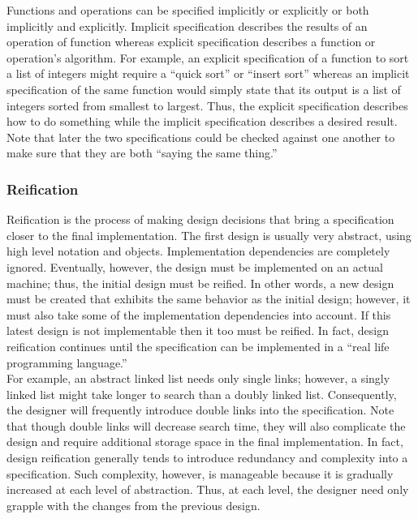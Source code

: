 \documentclass[11pt]{article}
\begin{document}
Functions and operations can be specified implicitly or explicitly or both implicitly and explicitly. Implicit specification describes the results of an operation of function whereas explicit specification describes a function or operation's algorithm.  For example, an explicit specification of a function to sort a list of integers might require a ``quick sort'' or  ``insert sort'' whereas an implicit specification of the same function would simply state that its output is a list of integers sorted from smallest to largest.  Thus, the explicit specification describes how to do something while the implicit specification describes a desired result.  Note that later the two specifications could be checked against one another to make sure that they are both ``saying the same thing.''
\subsubsection{Reification}

Reification is the process of making design decisions that bring a specification closer to the final implementation.  The first design is usually very abstract, using high level notation and objects.  Implementation dependencies are completely ignored.  Eventually, however, the design must be implemented on an actual machine; thus, the initial design must be reified.  In other words, a new design must be created that exhibits the same behavior as the initial design; however, it must also take some of the implementation dependencies into account.  If this latest design is not implementable then it too must be reified.  In fact, design reification continues until the specification can be implemented in a ``real life programming language.''\\

For example, an abstract linked list needs only single links; however, a singly linked list might take longer to search than a doubly linked list.  Consequently, the designer will frequently introduce double links into the specification.  Note that though double links will decrease search time, they will also complicate the design and require additional storage space in the final implementation.  In fact, design reification generally tends to introduce redundancy and complexity into a specification.  Such complexity, however, is manageable because it is gradually increased at each level of abstraction.  Thus, at each level, the designer need only grapple with the changes from the previous design.\\
\end{document}
